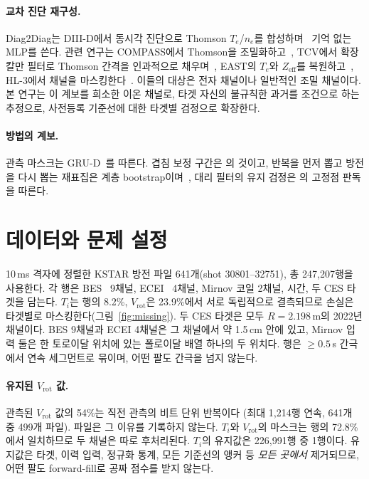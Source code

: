 \documentclass[10pt,twocolumn,letterpaper]{article}
\newcommand{\Ti}{\ensuremath{T_i}}
\newcommand{\Vrot}{\ensuremath{V_\mathrm{rot}}}
\begin{document}
\paragraph{교차 진단 재구성.} Diag2Diag는 DIII-D에서 동시각 진단으로 Thomson
$T_e$/$n_e$를 합성하며~\citep{Jalalvand2025MultimodalSuperresolution} 기억 없는 MLP를
쓴다. 관련 연구는 COMPASS에서 Thomson을 조밀화하고~\citep{Imrek2026TemporalSuperresolution},
TCV에서 확장 칼만 필터로 Thomson 간격을 인과적으로 채우며~\citep{Pastore2023ModelBased},
EAST의 $T_e$와 $Z_\mathrm{eff}$를 복원하고~\citep{Wang2025TimeSeries,Jia2026TimeSeries},
HL-3에서 채널을 마스킹한다~\citep{Yang2026FusionmaeSelfsupervised}. 이들의 대상은 전자
채널이나 일반적인 조밀 채널이다. 본 연구는 이 계보를 희소한 이온 채널로, 타겟 자신의
불규칙한 과거를 조건으로 하는 추정으로, 사전등록 기준선에 대한 타겟별 검정으로 확장한다.

\paragraph{방법의 계보.} 관측 마스크는 GRU-D~\citep{Che2018RecurrentNeural}를 따른다. 겹침
보정 구간은 \citep{Nadeau2003Inference}의 것이고, 반복을 먼저 뽑고 방전을 다시 뽑는
재표집은 계층 bootstrap이며~\citep{Saravanan2020Hierarchical}, 대리 필터의 유지 검정은
\citep{Maheswaranathan2020HowRecurrent}의 고정점 판독을 따른다.

\section{데이터와 문제 설정}
\label{sec:data}

10\,ms 격자에 정렬한 KSTAR 방전 파일 641개(shot 30801--32751), 총 247{,}207행을
사용한다. 각 행은 BES~\citep{Nam2012AnalysisEdge} 9채널, ECEI~\citep{Yun2010DevelopmentKstar}
4채널, Mirnov 코일 2채널, 시간, 두 CES 타겟을 담는다. \Ti{}는 행의 8.2\%, \Vrot{}은
23.9\%에서 서로 독립적으로 결측되므로 손실은 타겟별로 마스킹한다(그림~\ref{fig:missing}).
두 CES 타겟은 모두 $R = 2.198$\,m의 2022년 채널이다. BES 9채널과 ECEI 4채널은 그 채널에서
약 1.5\,cm 안에 있고, Mirnov 입력 둘은 한 토로이달 위치에 있는 폴로이달 배열 하나의 두
위치다. 행은 $\geq 0.5$\,s 간극에서 연속 세그먼트로 묶이며, 어떤 팔도 간극을 넘지 않는다.

\paragraph{유지된 \Vrot{} 값.} 관측된 \Vrot{} 값의 54\%는 직전 관측의 비트 단위 반복이다
(최대 1{,}214행 연속, 641개 중 499개 파일). 파일은 그 이유를 기록하지 않는다. \Ti{}와
\Vrot{}의 마스크는 행의 72.8\%에서 일치하므로 두 채널은 따로 후처리된다. \Ti{}의 유지값은
226{,}991행 중 1행이다. 유지값은 타겟, 이력 입력, 정규화 통계, 모든 기준선의 앵커 등
\emph{모든 곳에서} 제거되므로, 어떤 팔도 forward-fill로 공짜 점수를 받지 않는다.
\end{document}
